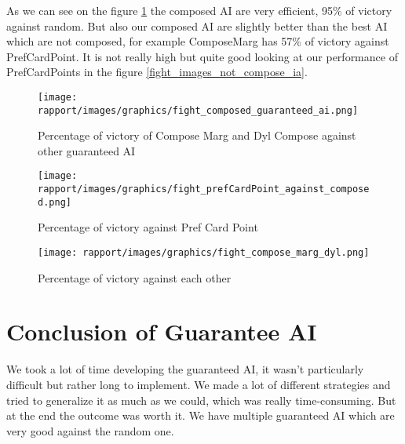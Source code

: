             As we can see on the figure \ref{fight_composed_against_other} the composed AI are very efficient, 95\% of victory against random. But also our composed AI are slightly better than the best AI which are not composed, for example ComposeMarg has 57\% of victory against PrefCardPoint. It is not really high but quite good looking at our performance of PrefCardPoints in the figure \ref{fight_images_not_compose_ia}.  
            
            \begin{figure}[H]
                \centering
                \texttt{[image: rapport/images/graphics/fight\_composed\_guaranteed\_ai.png]}
                \caption{Percentage of victory of Compose Marg and Dyl Compose against other guaranteed AI}
                \label{fight_composed_against_other}
            \end{figure}
            
            \begin{figure}[H]
                \centering
                \texttt{[image: rapport/images/graphics/fight\_prefCardPoint\_against\_composed.png]}
                \caption{Percentage of victory against Pref Card Point}
                \label{fight_against_pref_card_point}
            \end{figure}
            
             \begin{figure}[H]
                \centering
                \texttt{[image: rapport/images/graphics/fight\_compose\_marg\_dyl.png]}
                \caption{Percentage of victory against each other}
                \label{fight_compose}
            \end{figure}

    \section{Conclusion of Guarantee AI}
        We took a lot of time developing the guaranteed AI, it wasn't particularly difficult but rather long to implement. We made a lot of different strategies and tried to generalize it as much as we could, which was really time-consuming.
        But at the end the outcome was worth it. We have multiple guaranteed AI which are very good against the random one.
    